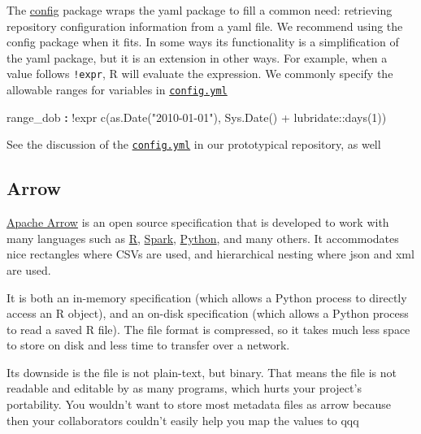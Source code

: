 \documentclass[
]{book}
\newenvironment{Shaded}{\begin{snugshade}}{\end{snugshade}}
\newcommand{\AttributeTok}[1]{\textcolor[rgb]{0.77,0.63,0.00}{#1}}
\newcommand{\FunctionTok}[1]{\textcolor[rgb]{0.00,0.00,0.00}{#1}}
\newcommand{\KeywordTok}[1]{\textcolor[rgb]{0.13,0.29,0.53}{\textbf{#1}}}
\begin{document}
The \href{https://github.com/rstudio/config}{config} package wraps the yaml package to fill a common need: retrieving repository configuration information from a yaml file. We recommend using the config package when it fits. In some ways its functionality is a simplification of the yaml package, but it is an extension in other ways. For example, when a value follows \texttt{!expr}, R will evaluate the expression. We commonly specify the allowable ranges for variables in \href{https://github.com/OuhscBbmc/cdw-skeleton-1/blob/master/config.yml}{\texttt{config.yml}}

\begin{Shaded}
\begin{Highlighting}[]
\FunctionTok{range\_dob   }\KeywordTok{:}\AttributeTok{ !expr c(as.Date("2010{-}01{-}01"), Sys.Date() + lubridate::days(1))}
\end{Highlighting}
\end{Shaded}

See the discussion of the \href{https://ouhscbbmc.github.io/data-science-practices-1/repo-prototype.html\#repo-config}{\texttt{config.yml}} in our prototypical repository, as well

\hypertarget{data-containers-arrow}{%
\subsection{Arrow}\label{data-containers-arrow}}

\href{https://arrow.apache.org/}{Apache Arrow} is an open source specification that is developed to work with many languages such as \href{https://arrow.apache.org/docs/r/}{R}, \href{https://towardsdatascience.com/a-gentle-introduction-to-apache-arrow-with-apache-spark-and-pandas-bb19ffe0ddae}{Spark}, \href{https://spark.apache.org/docs/latest/sql-pyspark-pandas-with-arrow.html}{Python}, and many others. It accommodates nice rectangles where CSVs are used, and hierarchical nesting where json and xml are used.

It is both an in-memory specification (which allows a Python process to directly access an R object), and an on-disk specification (which allows a Python process to read a saved R file). The file format is compressed, so it takes much less space to store on disk and less time to transfer over a network.

Its downside is the file is not plain-text, but binary. That means the file is not readable and editable by as many programs, which hurts your project's portability. You wouldn't want to store most metadata files as arrow because then your collaborators couldn't easily help you map the values to qqq
\end{document}
